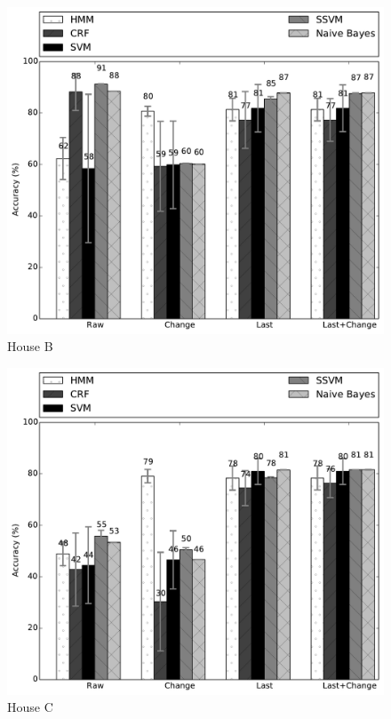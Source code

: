 \begin{figure}[t!]
\begin{center}
\includegraphics[width=5in]{../../src/reports/B.pdf}
\end{center}
\vspace{-0.5cm}
\caption{House B}
\label{fig:house_b}
\vspace{-0.5cm}
\end{figure}

\begin{figure}[t!]
\begin{center}
\includegraphics[width=5in]{../../src/reports/C.pdf}
\end{center}
\vspace{-0.5cm}
\caption{House C}
\label{fig:house_3}
\vspace{-0.5cm}
\end{figure}

